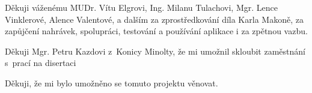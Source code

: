Děkuji
váženému MUDr. Vítu Elgrovi,
Ing. Milanu Tulachovi,
Mgr. Lence Vinklerové,
Alence Valentové,
a dalším za zprostředkování díla Karla Makoně, za zapůjčení nahrávek,
spolupráci, testování a používání aplikace i za zpětnou vazbu.

Děkuji
Mgr. Petru Kazdovi z~Konicy Minolty, že mi umožnil skloubit zaměstnání s~prací na disertaci

Děkuji, že mi bylo umožněno se tomuto projektu věnovat.
